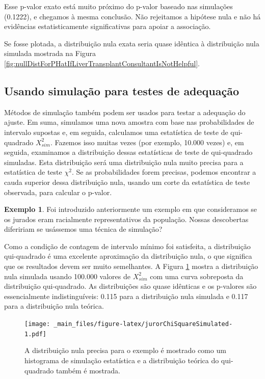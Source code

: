 \documentclass[
]{book}
\theoremstyle{definition}
\theoremstyle{definition}
\newtheorem{example}{Exemplo}[chapter]
\theoremstyle{definition}
\theoremstyle{definition}
\theoremstyle{remark}
\begin{document}
Esse p-valor exato está muito próximo do p-valor baseado nas simulações (0.1222), e chegamos à mesma conclusão. Não rejeitamos a hipótese nula e não há evidências estatisticamente significativas para apoiar a associação.

Se fosse plotada, a distribuição nula exata seria quase idêntica à distribuição nula simulada mostrada na Figura \ref{fig:nullDistForPHatIfLiverTransplantConsultantIsNotHelpful}.

\hypertarget{simulationFitnessTests}{%
\subsection{Usando simulação para testes de adequação}\label{simulationFitnessTests}}

Métodos de simulação também podem ser usados para testar a adequação do ajuste. Em suma, simulamos uma nova amostra com base nas probabilidades de intervalo supostas e, em seguida, calculamos uma estatística de teste de qui-quadrado \(X_{sim}^2\). Fazemos isso muitas vezes (por exemplo, 10.000 vezes) e, em seguida, examinamos a distribuição dessas estatísticas de teste de qui-quadrado simuladas. Esta distribuição será uma distribuição nula muito precisa para a estatística de teste \(\chi^2\). Se as probabilidades forem precisas, podemos encontrar a cauda superior dessa distribuição nula, usando um corte da estatística de teste observada, para calcular o p-valor.

\begin{example}
\protect\hypertarget{exm:unnamed-chunk-262}{}{\label{exm:unnamed-chunk-262} }Foi introduzido anteriormente um exemplo em que consideramos se os jurados eram racialmente representativos da população. Nossas descobertas difeririam se usássemos uma técnica de simulação?
\end{example}

Como a condição de contagem de intervalo mínimo foi satisfeita, a distribuição qui-quadrado é uma excelente aproximação da distribuição nula, o que significa que os resultados devem ser muito semelhantes. A Figura \ref{fig:jurorChiSquareSimulated} mostra a distribuição nula simulada usando 100.000 valores de \(X_{sim}^2\) com uma curva sobreposta da distribuição qui-quadrado. As distribuições são quase idênticas e os p-valores são essencialmente indistinguíveis: 0.115 para a distribuição nula simulada e 0.117 para a distribuição nula teórica.

\begin{figure}
\centering
\texttt{[image: \_main\_files/figure-latex/jurorChiSquareSimulated-1.pdf]}
\caption{\label{fig:jurorChiSquareSimulated}A distribuição nula precisa para o exemplo é mostrado como um histograma de simulação estatística e a distribuição teórica do qui-quadrado também é mostrada.}
\end{figure}
\end{document}
